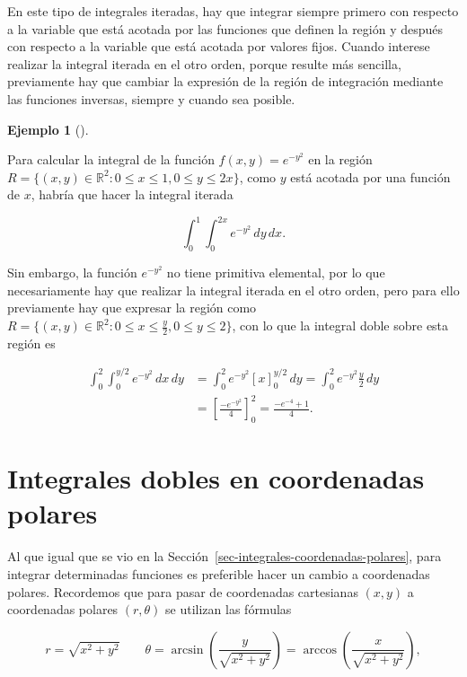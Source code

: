 \documentclass[
  a4paper,
]{scrreport}
\theoremstyle{definition}
\theoremstyle{definition}
\newtheorem{example}{Ejemplo}[chapter]
\theoremstyle{definition}
\theoremstyle{plain}
\theoremstyle{plain}
\theoremstyle{plain}
\theoremstyle{remark}
\begin{document}
En este tipo de integrales iteradas, hay que integrar siempre primero
con respecto a la variable que está acotada por las funciones que
definen la región y después con respecto a la variable que está acotada
por valores fijos. Cuando interese realizar la integral iterada en el
otro orden, porque resulte más sencilla, previamente hay que cambiar la
expresión de la región de integración mediante las funciones inversas,
siempre y cuando sea posible.

\begin{example}[]\protect\hypertarget{exm-integral-region-irregular-2}{}\label{exm-integral-region-irregular-2}

Para calcular la integral de la función \(f(x,y)=e^{-y^2}\) en la región
\(R=\{(x,y)\in \mathbb{R}^2: 0\leq x\leq 1, 0\leq y\leq 2x\}\), como
\(y\) está acotada por una función de \(x\), habría que hacer la
integral iterada

\[
\int_0^1\int_0^{2x} e^{-y^2}\,dy\,dx.
\]

Sin embargo, la función \(e^{-y^2}\) no tiene primitiva elemental, por
lo que necesariamente hay que realizar la integral iterada en el otro
orden, pero para ello previamente hay que expresar la región como
\(R=\{(x,y)\in \mathbb{R}^2: 0\leq x\leq \frac{y}{2}, 0\leq y\leq 2\}\),
con lo que la integral doble sobre esta región es

\begin{align*}
\int_0^2\int_0^{y/2} e^{-y^2}\,dx\,dy 
&= \int_0^2 e^{-y^2}[x]_0^{y/2}\,dy 
= \int_0^2 e^{-y^2}\frac{y}{2}\,dy \\
&= \left[\frac{-e^{-y^2}}{4}\right]_0^2
= \frac{-e^{-4}+1}{4}.
\end{align*}

\end{example}

\section{Integrales dobles en coordenadas
polares}\label{integrales-dobles-en-coordenadas-polares}

Al que igual que se vio en la
Sección~\ref{sec-integrales-coordenadas-polares}, para integrar
determinadas funciones es preferible hacer un cambio a coordenadas
polares. Recordemos que para pasar de coordenadas cartesianas \((x,y)\)
a coordenadas polares \((r,\theta)\) se utilizan las fórmulas

\[
r = \sqrt{x^2 + y^2} \qquad \theta = \operatorname{arcsin}\left(\frac{y}{\sqrt{x^2+y^2}}\right) = \operatorname{arccos}\left(\frac{x}{\sqrt{x^2+y^2}}\right),
\]
\end{document}
